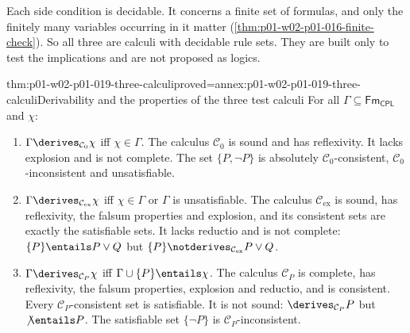 Each side condition is decidable. It concerns a finite set of formulas, and
only the finitely many variables occurring in it matter
(\cref{thm:p01-w02-p01-016-finite-check}). So all three are calculi with
decidable rule sets. They are built only to test the implications and are not
proposed as logics.

\begin{hbtheorem}{thm:p01-w02-p01-019-three-calculi}{proved=annex:p01-w02-p01-019-three-calculi}{Derivability and the properties of the three test calculi}
For all \(\Gamma\subseteq\mathsf{Fm}_{\mathsf{CPL}}\) and \(\chi\):
\begin{enumerate}
  \item \(\Gamma\derives_{\mathcal C_0}\chi\) iff \(\chi\in\Gamma\). The
        calculus \(\mathcal C_0\) is sound and has reflexivity. It lacks
        explosion and is not complete. The set \(\{P,\neg P\}\) is absolutely
        \(\mathcal C_0\)-consistent, \(\mathcal C_0\)-inconsistent and
        unsatisfiable.
  \item \(\Gamma\derives_{\mathcal C_{\mathrm{ex}}}\chi\) iff
        \(\chi\in\Gamma\) or \(\Gamma\) is unsatisfiable. The calculus
        \(\mathcal C_{\mathrm{ex}}\) is sound, has reflexivity, the falsum
        properties and explosion, and its consistent sets are exactly the
        satisfiable sets. It lacks reductio and is not complete:
        \(\{P\}\entails P\lor Q\) but
        \(\{P\}\notderives_{\mathcal C_{\mathrm{ex}}}P\lor Q\).
  \item \(\Gamma\derives_{\mathcal C_P}\chi\) iff
        \(\Gamma\cup\{P\}\entails\chi\). The calculus \(\mathcal C_P\) is
        complete, has reflexivity, the falsum properties, explosion and
        reductio, and is consistent. Every \(\mathcal C_P\)-consistent set is
        satisfiable. It is not sound: \(\derives_{\mathcal C_P}P\) but
        \(\not\entails P\). The satisfiable set \(\{\neg P\}\) is
        \(\mathcal C_P\)-inconsistent.
\end{enumerate}
\end{hbtheorem}

